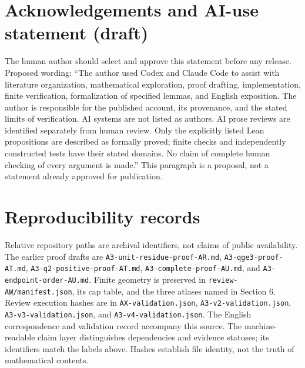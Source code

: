 \documentclass[11pt]{amsart}
\newcommand{\record}[1]{\nolinkurl{#1}}
\begin{document}
\section*{Acknowledgements and AI-use statement (draft)}
The human author should select and approve this statement before any
release. Proposed wording: ``The author used Codex and Claude Code
to assist with literature organization, mathematical exploration,
proof drafting, implementation, finite verification, formalization of
specified lemmas, and English exposition. The author is responsible
for the published account, its provenance, and the stated limits of
verification. AI systems are not listed as authors. AI prose reviews
are identified separately from human review. Only the explicitly
listed Lean propositions are described as formally proved; finite
checks and independently constructed tests have their stated domains.
No claim of complete human checking of every argument is made.''
This paragraph is a proposal, not a statement already approved for publication.

\section*{Reproducibility records}
Relative repository paths are archival identifiers, not claims of
public availability. The earlier proof drafts are
\record{A3-unit-residue-proof-AR.md}, \record{A3-qge3-proof-AT.md},
\record{A3-q2-positive-proof-AT.md}, \record{A3-complete-proof-AU.md},
and \record{A3-endpoint-order-AU.md}. Finite geometry is preserved in
\record{review-AW/manifest.json}, its cap table, and the three atlases
named in Section 6. Review execution hashes are in
\record{AX-validation.json}, \record{A3-v2-validation.json},
\record{A3-v3-validation.json}, and \record{A3-v4-validation.json}.
The English correspondence and validation record accompany this source.
The machine-readable claim layer distinguishes dependencies and
evidence statuses; its identifiers match the labels above. Hashes
establish file identity, not the truth of mathematical contents.
\end{document}
